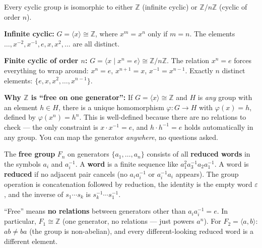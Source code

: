\documentclass[11pt]{report}
\begin{document}
\begin{rembox}
Every cyclic group is isomorphic to either $\mathbb{Z}$ (infinite cyclic) or $\mathbb{Z}/n\mathbb{Z}$ (cyclic of order $n$).

\textbf{Infinite cyclic:} $G = \langle x \rangle \cong \mathbb{Z}$, where $x^m = x^n$ only if $m = n$. The elements $\ldots, x^{-2}, x^{-1}, e, x, x^2, \ldots$ are all distinct.

\textbf{Finite cyclic of order $n$:} $G = \langle x \mid x^n = e \rangle \cong \mathbb{Z}/n\mathbb{Z}$. The relation $x^n = e$ forces everything to wrap around: $x^n = e$, $x^{n+1} = x$, $x^{-1} = x^{n-1}$. Exactly $n$ distinct elements: $\{e, x, x^2, \ldots, x^{n-1}\}$.

\textbf{Why $\mathbb{Z}$ is ``free on one generator'':} If $G = \langle x \rangle \cong \mathbb{Z}$ and $H$ is \emph{any} group with an element $h \in H$, there is a unique homomorphism $\varphi: G \to H$ with $\varphi(x) = h$, defined by $\varphi(x^n) = h^n$. This is well-defined because there are no relations to check --- the only constraint is $x \cdot x^{-1} = e$, and $h \cdot h^{-1} = e$ holds automatically in any group. You can map the generator \emph{anywhere}, no questions asked.
\end{rembox}

\begin{defbox}
The \textbf{free group} $F_n$ on generators $\{a_1, \ldots, a_n\}$ consists of all \textbf{reduced words} in the symbols $a_i$ and $a_i^{-1}$. A \textbf{word} is a finite sequence like $a_1^2 a_3^{-1} a_2 a_1^{-1}$. A word is \textbf{reduced} if no adjacent pair cancels (no $a_i a_i^{-1}$ or $a_i^{-1} a_i$ appears). The group operation is concatenation followed by reduction, the identity is the empty word $\varepsilon$, and the inverse of $s_1 \cdots s_k$ is $s_k^{-1} \cdots s_1^{-1}$.

``Free'' means \textbf{no relations} between generators other than $a_i a_i^{-1} = e$. In particular, $F_1 \cong \mathbb{Z}$ (one generator, no relations --- just powers $a^n$). For $F_2 = \langle a, b \rangle$: $ab \neq ba$ (the group is non-abelian), and every different-looking reduced word is a different element.
\end{defbox}
\end{document}
